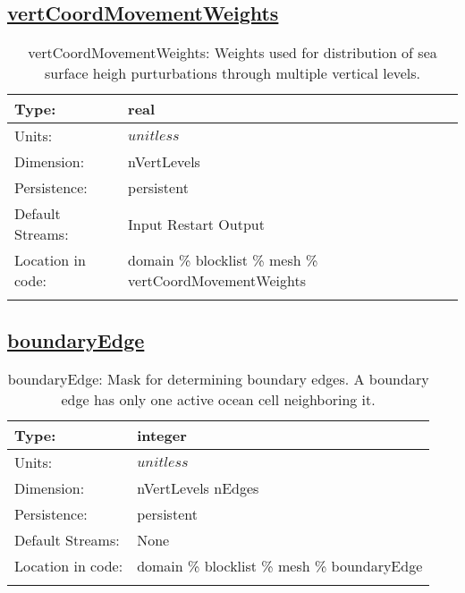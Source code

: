 \subsection[vertCoordMovementWeights]{\hyperref[sec:var_tab_mesh]{vertCoordMovementWeights}}
\label{subsec:var_sec_mesh_vertCoordMovementWeights}
\begin{center}
\begin{longtable}{| p{2.0in} | p{4.0in} |}
        \hline 
        Type: & real \\
        \hline 
        Units: & $unitless$ \\
        \hline 
        Dimension: & nVertLevels \\
        \hline 
        Persistence: & persistent \\
        \hline 
		 Default Streams: & Input Restart Output  \\
        \hline 
		 Location in code: & domain \% blocklist \% mesh \% vertCoordMovementWeights \\
		 \hline 
    \caption{vertCoordMovementWeights: Weights used for distribution of sea surface heigh purturbations through multiple vertical levels.}
\end{longtable}
\end{center}
\subsection[boundaryEdge]{\hyperref[sec:var_tab_mesh]{boundaryEdge}}
\label{subsec:var_sec_mesh_boundaryEdge}
\begin{center}
\begin{longtable}{| p{2.0in} | p{4.0in} |}
        \hline 
        Type: & integer \\
        \hline 
        Units: & $unitless$ \\
        \hline 
        Dimension: & nVertLevels nEdges \\
        \hline 
        Persistence: & persistent \\
        \hline 
		 Default Streams: & None \\
        \hline 
		 Location in code: & domain \% blocklist \% mesh \% boundaryEdge \\
		 \hline 
    \caption{boundaryEdge: Mask for determining boundary edges. A boundary edge has only one active ocean cell neighboring it.}
\end{longtable}
\end{center}
